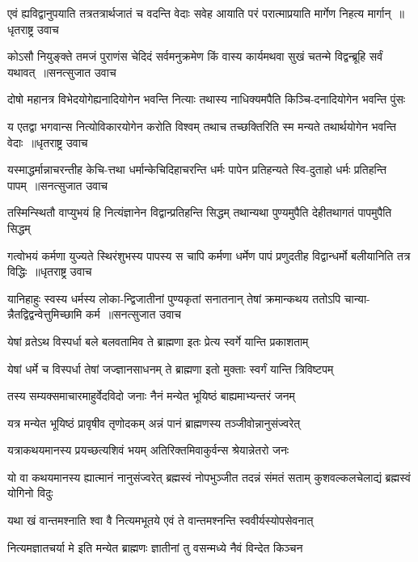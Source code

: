 \threelineshloka
{एवं ह्यविद्वानुपयाति तत्रतत्रार्थजातं च वदन्ति वेदाः}
{सवेह आयाति परं परात्माप्रयाति मार्गेण निहत्य मार्गान् ॥धृतराष्ट्र उवाच}
{}


\threelineshloka
{कोऽसौ नियुङ्क्ते तमजं पुराणंस चेदिदं सर्वमनुक्रमेण}
{किं वास्य कार्यमथवा सुखं चतन्मे विद्वन्ब्रूहि सर्वं यथावत् ॥सनत्सुजात उवाच}
{}


\twolineshloka
{दोषो महानत्र विभेदयोगेह्यनादियोगेन भवन्ति नित्याः}
{तथास्य नाधिक्यमपैति किञ्चि-दनादियोगेन भवन्ति पुंसः}


\fourlineindentedshloka
{य एतद्वा भगवान्स नित्योविकारयोगेन करोति विश्वम्}
{तथाच तच्छक्तिरिति स्म मन्यते}
{तथार्थयोगेन भवन्ति वेदाः ॥धृतराष्ट्र उवाच}
{}


\threelineshloka
{यस्माद्धर्मान्नाचरन्तीह केचि-त्तथा धर्मान्केचिदिहाचरन्ति}
{धर्मः पापेन प्रतिहन्यते स्वि-दुताहो धर्मः प्रतिहन्ति पापम् ॥सनत्सुजात उवाच}
{}


\twolineshloka
{तस्मिन्स्थितौ वाप्युभयं हि नित्यंज्ञानेन विद्वान्प्रतिहन्ति सिद्धम्}
{तथान्यथा पुण्यमुपैति देहीतथागतं पापमुपैति सिद्धम्}


\threelineshloka
{गत्वोभयं कर्मणा युज्यते स्थिरंशुभस्य पापस्य स चापि कर्मणा}
{धर्मेण पापं प्रणुदतीह विद्वान्धर्मो बलीयानिति तत्र विद्धिः ॥धृतराष्ट्र उवाच}
{}


\threelineshloka
{यानिहाहुः स्वस्य धर्मस्य लोका-न्द्विजातीनां पुण्यकृतां सनातनान्}
{तेषां क्रमान्कथय ततोऽपि चान्या-न्नैतद्विद्वन्वेत्तुमिच्छामि कर्म ॥सनत्सुजात उवाच}
{}


\twolineshloka
{येषां व्रतेऽथ विस्पर्धा बले बलवतामिव}
{ते ब्राह्मणा इतः प्रेत्य स्वर्गे यान्ति प्रकाशताम्}


\twolineshloka
{येषां धर्मे च विस्पर्धा तेषां जज्ज्ञानसाधनम्}
{ते ब्राह्मणा इतो मुक्ताः स्वर्गं यान्ति त्रिविष्टपम्}


\twolineshloka
{तस्य सम्यक्समाचारमाहुर्वेदविदो जनाः}
{नैनं मन्येत भूयिष्ठं बाह्यमाभ्यन्तरं जनम्}


\twolineshloka
{यत्र मन्येत भूयिष्ठं प्रावृषीव तृणोदकम्}
{अन्नं पानं ब्राह्मणस्य तञ्जीवोन्नानुसंज्वरेत्}


\twolineshloka
{यत्राकथयमानस्य प्रयच्छत्यशिवं भयम्}
{अतिरिक्तमिवाकुर्वन्स श्रेयान्नेतरो जनः}


\threelineshloka
{यो वा कथयमानस्य ह्यात्मानं नानुसंज्वरेत्}
{ब्रह्मस्वं नोपभुञ्जीत तदन्नं संमतं सताम्}
{कुशवल्कलचेलाद्यं ब्रह्मस्वं योगिनो विदुः}


\twolineshloka
{यथा खं वान्तमश्नाति श्वा वै नित्यमभूतये}
{एवं ते वान्तमश्नन्ति स्ववीर्यस्योपसेवनात्}


\twolineshloka
{नित्यमज्ञातचर्या मे इति मन्येत ब्राह्मणः}
{ज्ञातीनां तु वसन्मध्ये नैवं विन्देत किञ्चन}


